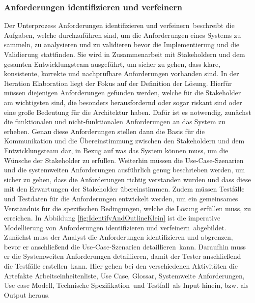 \subsubsection{Anforderungen identifizieren und verfeinern}
 Der Unterprozess \grqq Anforderungen identifizieren und verfeinern\grqq \ beschreibt die Aufgaben, welche durchzuführen sind, um die Anforderungen eines Systems zu sammeln, zu analysieren und zu validieren bevor die Implementierung und die Validierung stattfinden. Sie wird in Zusammenarbeit mit Stakeholdern und dem gesamten Entwicklungsteam ausgeführt, um sicher zu gehen, dass klare, konsistente, korrekte und nachprüfbare Anforderungen vorhanden sind.\newline
 In der Iteration Elaboration liegt der Fokus auf der Definition der Lösung. Hierfür müssen diejenigen Anforderungen gefunden werden, welche für die Stakeholder am wichtigsten sind, die besonders herausfordernd oder sogar riskant sind oder eine große Bedeutung für die Architektur haben.\newline
 Dafür ist es notwendig, zunächst die funktionalen und nicht-funktionalen Anforderungen an das System zu erheben. Genau diese Anforderungen stellen dann die Basis für die Kommunikation und die Übereinstimmung zwischen den Stakeholdern und dem Entwicklungsteam dar, in Bezug auf was das System können muss, um die Wünsche der Stakeholder zu erfüllen.\newline
 Weiterhin müssen die Use-Case-Szenarien und die systemweiten Anforderungen ausführlich genug beschrieben werden, um sicher zu gehen, dass die Anforderungen richtig verstanden wurden und dass diese mit den Erwartungen der Stakeholder übereinstimmen.\newline
 Zudem müssen Testfälle und Testdaten für die Anforderungen entwickelt werden, um ein gemeinsames Verständnis für die spezifischen Bedingungen, welche die Lösung erfüllen muss, zu erreichen.
 In Abbildung \ref{fig:IdentifyAndOutlineKlein} ist die imperative Modellierung von \grqq Anforderungen identifizieren und verfeinern\grqq \ abgebildet. \newline
 Zunächst muss der Analyst die \grqq Anforderungen identifizieren und abgrenzen\grqq, bevor er anschließend die \grqq Use-Case-Szenarien detaillieren\grqq \ kann. Daraufhin muss er die \grqq Systemweiten Anforderungen detaillieren\grqq, damit der Tester anschließend die \grqq Testfälle erstellen\grqq \ kann.\newline
 Hier gehen bei den verschiedenen Aktivitäten die Artefakte \grqq Arbeitseinheitenliste\grqq, \grqq Use Case\grqq, \grqq Glossar\grqq, \grqq Systemweite Anforderungen\grqq, \grqq Use case Modell\grqq, \grqq Technische Spezifikation\grqq \ und \grqq Testfall\grqq \ als Input hinein, bzw. als Output heraus.
 
